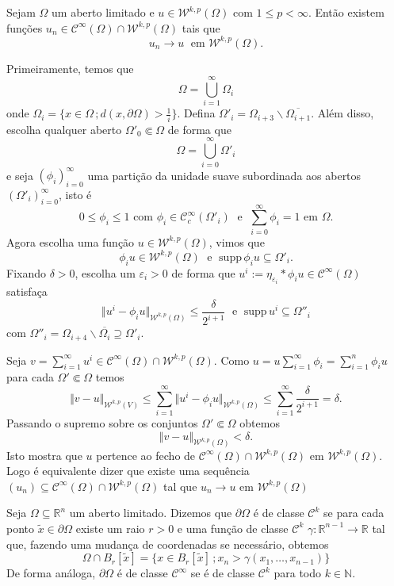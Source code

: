\documentclass[a4paper, 11pt]{book}
\theoremstyle{definition}
\newcommand{\bN}{\mathbb{N}}
\newcommand{\bR}{\mathbb{R}}
\newcommand{\cC}{\mathcal{C}}
\newcommand{\cW}{\mathcal{W}}
\newcommand{\supp}{\mathrm{supp}\,}
\begin{document}
\begin{tbox}
    Sejam $\Omega$ um aberto limitado e $u \in \cW^{k,p}(\Omega)$ com $1 \leqslant p < \infty$.
    Então existem funções $u_n \in \cC^{\infty}(\Omega) \cap \cW^{k,p}(\Omega)$ tais que
    \[
        u_n \to u \;\text{ em } \cW^{k,p}(\Omega).
    \] 
\end{tbox}
\begin{prf}
    Primeiramente, temos que
    \[
        \Omega = \bigcup_{i=1}^\infty \Omega_i   
    \]
    onde $\Omega_i = \{x \in \Omega \,; d(x, \partial\Omega) > \tfrac{1}{i}\}$. Defina $\Omega'_i = \Omega_{i+3} \smallsetminus \overline{\Omega_{i+1}}$.
    Além disso, escolha qualquer aberto $\Omega'_0 \Subset \Omega$ de forma que
    \[
        \Omega = \bigcup_{i=0}^\infty \Omega'_i
    \]
    e seja $(\phi_i)_{i=0}^\infty$ uma partição da unidade suave subordinada aos abertos $(\Omega'_i)_{i=0}^\infty$, isto é
    \[
       0 \leqslant \phi_i \leqslant 1 \text{ com } \phi_i \in \cC^\infty_c(\Omega'_i) \;\text{ e }\; \sum_{i=0}^\infty \phi_i = 1 \text{ em } \Omega.
    \]
    Agora escolha uma função $u \in \cW^{k,p}(\Omega)$, vimos que
    \[
        \phi_i u \in \cW^{k,p}(\Omega) \;\text{ e }\; \supp \phi_i u \subseteq \Omega'_i.
    \]
    Fixando $\delta > 0$, escolha um $\varepsilon_i > 0$ de forma que $u^i := \eta_{\varepsilon_i} * \phi_i u \in \cC^{\infty}(\Omega)$ satisfaça
    \[
        \Vert u^i - \phi_i u \Vert_{\cW^{k,p}(\Omega)} \leqslant \frac{\delta}{2^{i+1}} \;\text{ e }\; \supp u^i \subseteq \Omega''_i
    \]
    com $\Omega''_i = \Omega_{i+4} \smallsetminus \overline{\Omega_{i}} \supseteq \Omega'_i$.

    Seja $v = \sum_{i=1}^\infty u^i \in \cC^{\infty}(\Omega) \cap \cW^{k,p}(\Omega)$.
    Como $u = u \sum_{i=1}^\infty \phi_i = \sum_{i=1}^n \phi_i u$ para cada $\Omega' \Subset \Omega$ temos
    \[
        \Vert v - u \Vert_{\cW^{k,p}(V)} \leqslant \sum_{i=1}^\infty \Vert u^i - \phi_i u \Vert_{\cW^{k,p}(\Omega)} \leqslant \sum_{i=1}^\infty \frac{\delta}{2^{i+1}} = \delta.
    \]
    Passando o supremo sobre os conjuntos $\Omega' \Subset \Omega$ obtemos
    \[
        \Vert v - u \Vert_{\cW^{k,p}(\Omega)} < \delta.
    \]
    Isto mostra que $u$ pertence ao fecho de $\cC^\infty(\Omega) \cap \cW^{k,p}(\Omega)$ em $\cW^{k,p}(\Omega)$. Logo é equivalente dizer que existe uma sequência $(u_n) \subseteq \cC^\infty(\Omega) \cap \cW^{k,p}(\Omega)$ tal que $u_n \to u$ em $\cW^{k,p}(\Omega)$
\end{prf}

\begin{dbox} \label{def:fronteira-ck}
    Seja $\Omega \subseteq \bR^n$ um aberto limitado. 
    Dizemos que $\partial \Omega$ é de classe $\cC^k$ se para cada ponto $\tilde x \in \partial \Omega$ existe um raio $r > 0$ e uma função de classe $\cC^k$ $\gamma : \bR^{n-1} \to \bR$ tal que, fazendo uma mudança de coordenadas se necessário, obtemos
    \[
        \Omega \cap B_r[\tilde x] = \{x \in B_r[\tilde x] \,; x_n > \gamma(x_1,\dots,x_{n-1})\}
    \]
    De forma análoga, $\partial\Omega$ é de classe $\cC^\infty$ se é de classe $\cC^k$ para todo $k \in \bN$.
\end{dbox}
\end{document}
